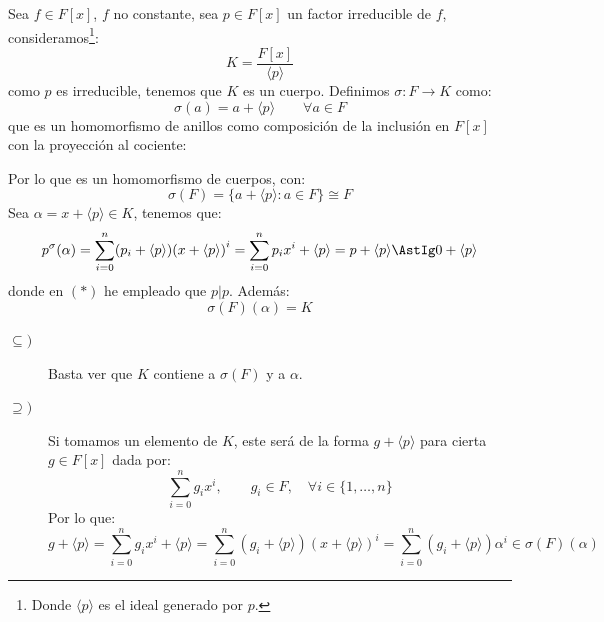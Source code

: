 \begin{ejemplo}\label{ejemplo:cuerpo_descomposicion}
    Sea $f\in F[x]$, $f$ no constante, sea $p\in F[x]$ un factor irreducible de $f$, consideramos\footnote{Donde $\langle p \rangle $ es el ideal generado por $p$.}:
    \begin{equation*}
        K = \dfrac{F[x]}{\langle p \rangle }
    \end{equation*}
    como $p$ es irreducible, tenemos que $K$ es un cuerpo. Definimos $\sigma:F\to K$ como:
    \begin{equation*}
        \sigma(a) = a + \langle p \rangle  \qquad \forall a\in F
    \end{equation*}
    que es un homomorfismo de anillos como composición de la inclusión en $F[x]$ con la proyección al cociente:
    \begin{figure}[H]
        \centering
    \end{figure}
    \noindent
    Por lo que es un homomorfismo de cuerpos, con:
    \begin{equation*}
        \sigma(F) = \{a+\langle p \rangle : a\in F\} \cong F
    \end{equation*}
    Sea $\alpha = x+\langle p \rangle \in K$, tenemos que:
    \begin{equation*}
        p^\sigma(\alpha) = \sum_{i=0}^{n} (p_i + \langle p \rangle){(x+\langle p \rangle )}^{i} = \sum_{i=0}^{n} p_ix^i + \langle p \rangle  = p + \langle p \rangle  \AstIg 0 + \langle p \rangle 
    \end{equation*}
    donde en $(\ast)$ he empleado que $p|p$.
    Además:
    \begin{equation*}
        \sigma(F)(\alpha) = K
    \end{equation*}
    \begin{description}
        \item [$\subseteq )$] Basta ver que $K$ contiene a $\sigma(F)$ y a $\alpha$.
        \item [$\supseteq )$] Si tomamos un elemento de $K$, este será de la forma $g+\langle p \rangle $ para cierta $g\in F[x]$ dada por:
            \begin{equation*}
                \sum_{i=0}^{n}g_ix^i, \qquad g_i \in F, \quad \forall i \in \{1,\ldots,n\}
            \end{equation*}
            Por lo que:
            \begin{equation*}
                g+\langle p \rangle  = \sum_{i=0}^{n}g_ix^i + \langle p \rangle  = \sum_{i=0}^{n}(g_i+\langle p \rangle ){(x+\langle p \rangle )}^{i}
                = \sum_{i=0}^{n}(g_i+\langle p \rangle ){\alpha}^{i} \in \sigma(F)(\alpha)
            \end{equation*}
    \end{description}
\end{ejemplo}

